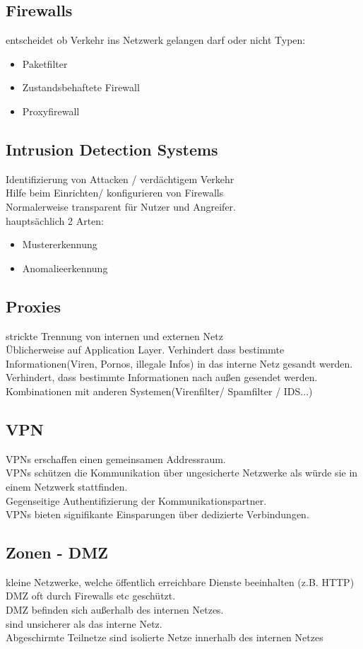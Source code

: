 \documentclass{article} %
\begin{document}
\subsection{Firewalls}
entscheidet ob Verkehr ins Netzwerk gelangen darf oder nicht
Typen: 
\begin{itemize}
	\item Paketfilter
    \item Zustandsbehaftete Firewall
    \item Proxyfirewall
\end{itemize}
\subsection{Intrusion Detection Systems}
Identifizierung von Attacken / verdächtigem Verkehr \\
Hilfe beim Einrichten/ konfigurieren von Firewalls \\
Normalerweise transparent für Nutzer und Angreifer.\\
hauptsächlich 2 Arten:
\begin{itemize}
	\item Mustererkennung
    \item Anomalieerkennung
\end{itemize}
\subsection{Proxies}
strickte Trennung von internen und externen Netz\\
Üblicherweise auf Application Layer. Verhindert dass bestimmte Informationen(Viren, Pornos, illegale Infos) in das interne Netz gesandt werden.\\
Verhindert, dass bestimmte Informationen nach außen gesendet werden.\\
Kombinationen mit anderen Systemen(Virenfilter/ Spamfilter / IDS...)\\
\subsection{VPN}
VPNs erschaffen einen gemeinsamen Addressraum.\\
VPNs schützen die Kommunikation über ungesicherte Netzwerke als würde sie in einem Netzwerk stattfinden.\\
Gegenseitige Authentifizierung der Kommunikationspartner.\\
VPNs bieten signifikante Einsparungen über dedizierte Verbindungen.
\subsection{Zonen - DMZ}
kleine Netzwerke, welche öffentlich erreichbare Dienste beeinhalten (z.B. HTTP)\\
DMZ oft durch Firewalls etc geschützt.\\
DMZ befinden sich außerhalb des internen Netzes.\\
sind unsicherer als das interne Netz.\\
Abgeschirmte Teilnetze sind isolierte Netze innerhalb des internen Netzes
\end{document}
